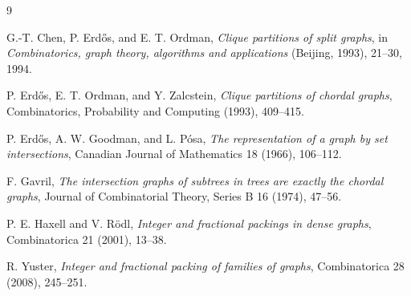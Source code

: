 \documentclass[11pt]{article}
\theoremstyle{definition}
\begin{document}
\begin{thebibliography}{9}

G.-T. Chen, P. Erd\H{o}s, and E. T. Ordman,
\emph{Clique partitions of split graphs},
in \emph{Combinatorics, graph theory, algorithms and applications} (Beijing, 1993), 21--30, 1994.

P. Erd\H{o}s, E. T. Ordman, and Y. Zalcstein,
\emph{Clique partitions of chordal graphs},
Combinatorics, Probability and Computing (1993), 409--415.

P. Erd\H{o}s, A. W. Goodman, and L. P\'osa,
\emph{The representation of a graph by set intersections},
Canadian Journal of Mathematics 18 (1966), 106--112.

F. Gavril,
\emph{The intersection graphs of subtrees in trees are exactly the chordal graphs},
Journal of Combinatorial Theory, Series B 16 (1974), 47--56.

P. E. Haxell and V. R\"odl,
\emph{Integer and fractional packings in dense graphs},
Combinatorica 21 (2001), 13--38.

R. Yuster,
\emph{Integer and fractional packing of families of graphs},
Combinatorica 28 (2008), 245--251.

\end{thebibliography}
\end{document}
